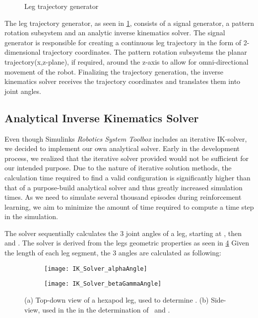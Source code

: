 \begin{figure}
	\centerline{}
	\caption{Leg trajectory generator}
	\label{figure: Leg trajectory generator}
\end{figure}

The leg trajectory generator, as seen in \ref{figure: Leg trajectory generator}, consists of a signal generator, a pattern rotation subsystem and an analytic inverse kinematics solver.
The signal generator is responsible for creating a continuous leg trajectory in the form of 2-dimensional trajectory coordinates.
The pattern rotation subsystems the planar trajectory(x,z-plane), if required, around the z-axis to allow for omni-directional movement of the robot.
Finalizing the trajectory generation, the inverse kinematics solver receives the trajectory coordinates and translates them into joint angles.


\subsection{Analytical Inverse Kinematics Solver}
Even though Simulinks \textit{Robotics System Toolbox} includes an iterative IK-solver, we decided to implement our own analytical solver.
Early in the development process, we realized that the iterative solver provided would not be sufficient for our intended purpose.
Due to the nature of iterative solution methods, the calculation time required to find a valid configuration is significantly higher than that of a purpose-build analytical solver and thus greatly increased simulation times.
As we need to simulate several thousand episodes during reinforcement learning, we aim to minimize the 
amount of time required to compute a time step in the simulation.

The solver sequentially calculates the 3 joint angles of a leg, starting at \textalpha, then \textbeta and \textgamma.
The solver is derived from the legs geometric properties as seen in \ref{figure: IK angle derivations}
Given the length of each leg segment, the 3 angles are calculated as following:

\begin{figure}[h]
	\begin{subfigure}{.5\textwidth} %
		\centering
		\texttt{[image: IK\_Solver\_alphaAngle]}  %
		\caption{}
		\label{figure: IK Solver Alpha Angle}
	\end{subfigure}
	\begin{subfigure}{.5\textwidth}
		\centering
		\texttt{[image: IK\_Solver\_betaGammaAngle]}  
		\caption{}
		\label{figure: IK Solver Beta/Gamma Angle}
	\end{subfigure}
	\caption[Angle derivation drawings]{(a) Top-down view of a hexapod leg, used to determine \textalpha. (b) Side-view, used in the in the determination of \textbeta \ and \textgamma.}
	\label{figure: IK angle derivations}
\end{figure}



